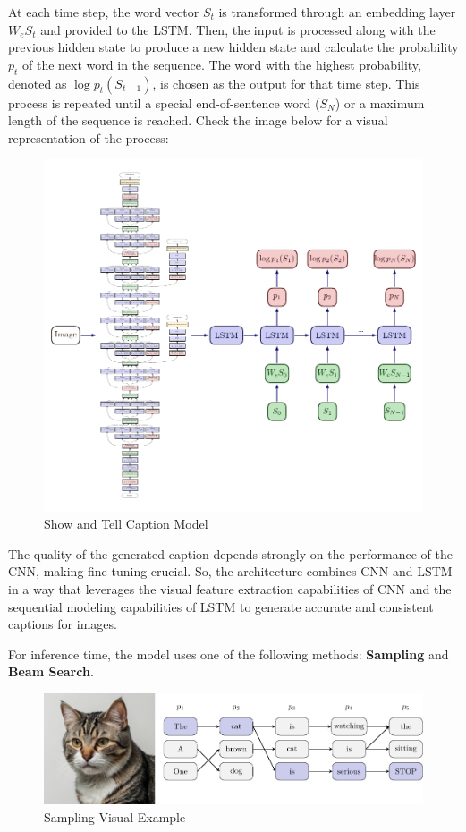 At each time step, the word vector $S_t$ is transformed through an embedding layer $W_e S_t$ and provided to the LSTM. Then, the input is processed along with the previous hidden state to produce a new hidden state and calculate the probability $p_t$ of the next word in the sequence. The word with the highest probability, denoted as $\log p_t(S_{t+1})$, is chosen as the output for that time step. This process is repeated until a special end-of-sentence word ($S_N$) or a maximum length of the sequence is reached. Check the image below for a visual representation of the process:
\newpage

\begin{figure}[!htbp]
    \centering
    \includegraphics[width=\linewidth]{tikz/chapter7 - Show and Tell Model.pdf}
    \caption{Show and Tell Caption Model}
\end{figure}

The quality of the generated caption depends strongly on the performance of the CNN, making fine-tuning crucial. So, the architecture combines CNN and LSTM in a way that leverages the visual feature extraction capabilities of CNN and the sequential modeling capabilities of LSTM to generate accurate and consistent captions for images.

For inference time, the model uses one of the following methods: \textbf{Sampling} and \textbf{Beam Search}.

\begin{figure}[!htbp]
    \centering
    \includegraphics[width=\linewidth]{tikz/chapter7 - Sampling.pdf}
    \caption{Sampling Visual Example}
\end{figure}

